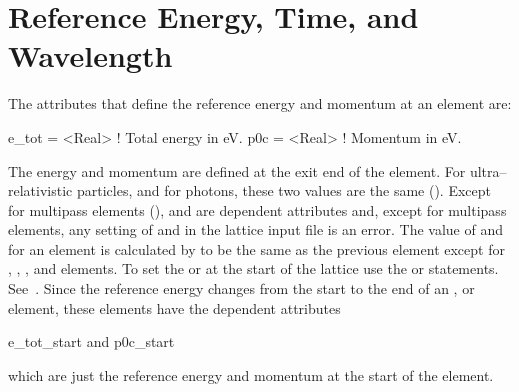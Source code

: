 \section{Reference Energy, Time, and Wavelength}
\label{s:energy}

The attributes that define the reference energy and momentum at an element are:
\begin{example}
  e_tot  = <Real>  ! Total energy in eV.
  p0c    = <Real>  ! Momentum in eV.
\end{example}
The energy and momentum are defined at the exit end of the element.  For ultra--relativistic
particles, and for photons, these two values are the same (). Except for
multipass elements (),  and  are dependent attributes and,
except for multipass elements, any setting of  and  in the lattice input file is
an error. The value of  and  for an element is calculated by \bmad to be the same
as the previous element except for , , , and 
elements. To set the  or  at the start of the lattice use the  or
 statements.  See~. Since the reference energy changes from the start to
the end of an ,  or  element, these elements have the
dependent attributes
\begin{example}
  e_tot_start   and
  p0c_start
\end{example}
which are just the reference energy and momentum at the start of the element.

